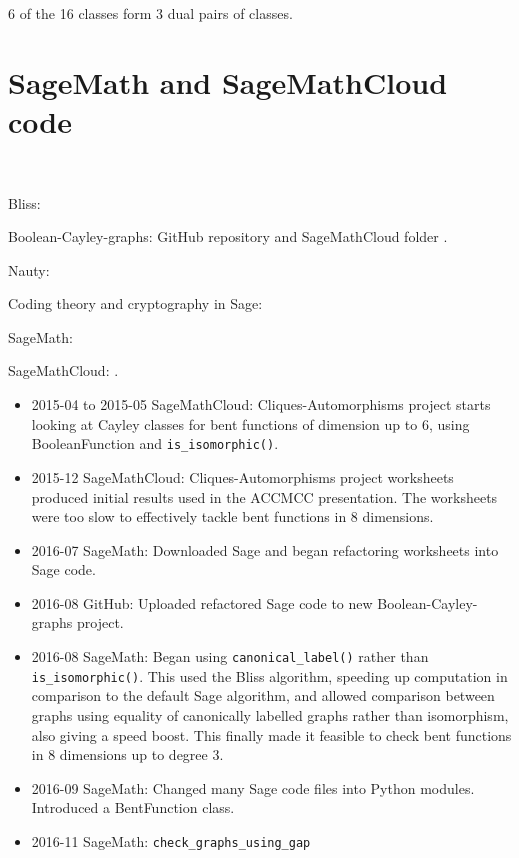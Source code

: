 \documentclass[12pt,a4paper]{article}
\begin{document}
6 of the 16 classes form 3 dual pairs of classes.

\section{SageMath and SageMathCloud code}
\label{sec-Code}
~

Bliss: \cite{JunK07Bliss,JukN11conflict}

Boolean-Cayley-graphs: GitHub repository \cite{Leo16GitHub} and SageMathCloud folder
\cite{Leo16SMC}.

Nauty: \cite{McKP13nauty,McKP14practical}

Coding theory and cryptography in Sage: \cite{JoyEtAl13Sage}

SageMath: \cite{SageMath7517}

SageMathCloud: \cite{SageMathCloud}.


\begin{itemize}
 \item 2015-04 to 2015-05 SageMathCloud: Cliques-Automorphisms project starts looking at Cayley
classes for bent functions of dimension up to 6, using BooleanFunction and \verb!is_isomorphic()!.
 \item 2015-12 SageMathCloud: Cliques-Automorphisms project
worksheets produced initial results used in the ACCMCC presentation.
The worksheets were too slow to effectively tackle bent functions in 8 dimensions.
 \item 2016-07 SageMath: Downloaded Sage and began refactoring worksheets into Sage code.
 \item 2016-08 GitHub: Uploaded refactored Sage code to new Boolean-Cayley-graphs project.
 \item 2016-08 SageMath: Began using \verb!canonical_label()! rather than \verb!is_isomorphic()!.
This used the Bliss algorithm, speeding up computation in comparison to the default Sage algorithm,
and allowed comparison between graphs using equality of canonically labelled graphs rather than
isomorphism, also giving a speed boost. This finally made it feasible to check bent functions in 8
dimensions up to degree 3.
 \item 2016-09 SageMath: Changed many Sage code files into Python modules. Introduced a
BentFunction class.
 \item 2016-11 SageMath: \verb!check_graphs_using_gap!
\end{itemize}
\end{document}

